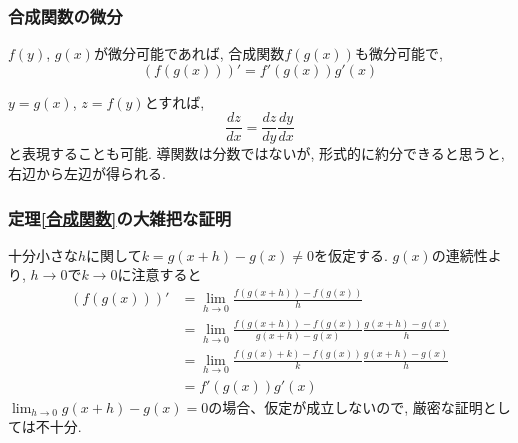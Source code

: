 \begin{frame}
\frametitle{合成関数の微分}


\begin{Thm} \label{合成関数}
$f(y)$, $g(x)$が微分可能であれば, 合成関数$f(g(x))$も微分可能で, 
$$
(f(g(x)))'=f'(g(x))g'(x)
$$
\end{Thm}
$y=g(x)$, $z=f(y)$とすれば, 
$$
\frac{dz}{dx}=\frac{dz}{dy} \frac{dy}{dx}
$$
と表現することも可能. 
導関数は分数ではないが, 形式的に約分できると思うと, 右辺から左辺が得られる. 

\end{frame}




\begin{frame}
\frametitle{定理\ref{合成関数}の大雑把な証明}


十分小さな$h$に関して$k=g(x+h)- g(x)\ne 0$を仮定する. 
$g(x)$の連続性より, $h \to 0$で$k\to 0$に注意すると
\begin{align*} 
(f(g(x)))' &= \lim_{h\to 0}\frac{f(g(x+h))-f(g(x))}{h} \\
& =  \lim_{h\to 0}\frac{f(g(x+h))-f(g(x))}{g(x+h)-g(x)} \frac{g(x+h)-g(x)}{h} \\
& =  \lim_{h\to 0}\frac{f(g(x)+k)-f(g(x))}{k} \frac{g(x+h)-g(x)}{h} \\
& =f'(g(x))g'(x)
\end{align*}
$\lim_{h\to 0}g(x+h) - g(x) = 0$の場合、仮定が成立しないので, 厳密な証明としては不十分. 

\end{frame}




